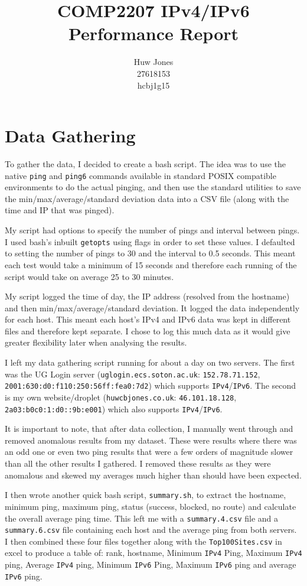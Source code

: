 \documentclass[a4paper]{article}
\author{Huw Jones\\27618153\\hcbj1g15}
\title{COMP2207 IPv4/IPv6 Performance Report}
\def \IPF {\texttt{IPv4}}
\def \IPS {\texttt{IPv6}}
\begin{document}
\maketitle
\newpage

\section{Data Gathering}
To gather the data, I decided to create a bash script.
The idea was to use the native \texttt{ping} and \texttt{ping6} commands available in standard POSIX compatible environments to do the actual pinging,
and then use the standard utilities to save the min/max/average/standard deviation data into a CSV file (along with the time and IP that was pinged).

My script had options to specify the number of pings and interval between pings.
I used bash's inbuilt \texttt{getopts} using flags in order to set these values.
I defaulted to setting the number of pings to 30 and the interval to 0.5 seconds.
This meant each test would take a minimum of 15 seconds and therefore each running of the script would take on average 25 to 30 minutes.

My script logged the time of day, the IP address (resolved from the hostname) and then min/max/average/standard deviation.
It logged the data independently for each host.
This meant each host's IPv4 and IPv6 data was kept in different files and therefore kept separate.
I chose to log this much data as it would give greater flexibility later when analysing the results.

I left my data gathering script running for about a day on two servers.
The first was the UG Login server (\texttt{uglogin.ecs.soton.ac.uk}: \texttt{152.78.71.152}, \texttt{2001:630:d0:f110:250:56ff:fea0:7d2}) which supports \IPF/\IPS.
The second is my own website/droplet (\texttt{huwcbjones.co.uk}: \texttt{46.101.18.128}, \texttt{2a03:b0c0:1:d0::9b:e001}) which also supports \IPF/\IPS.

It is important to note, that after data collection, I manually went through and removed anomalous results from my dataset.
These were results where there was an odd one or even two ping results that were a few orders of magnitude slower than all the other results I gathered.
I removed these results as they were anomalous and skewed my averages much higher than should have been expected.

I then wrote another quick bash script, \texttt{summary.sh}, to extract the hostname, minimum ping, maximum ping, status (success, blocked, no route)
  and calculate the overall average ping time.
This left me with a \texttt{summary.4.csv} file and a \texttt{summary.6.csv} file containing each host and the average ping from both servers.
I then combined these four files together along with the \texttt{Top100Sites.csv} in excel to produce a table of:
rank, hostname, Minimum {\IPF} Ping, Maximum {\IPF} ping, Average {\IPF} ping, Minimum {\IPS} Ping, Maximum {\IPS} ping and average {\IPS} ping.
\end{document}
